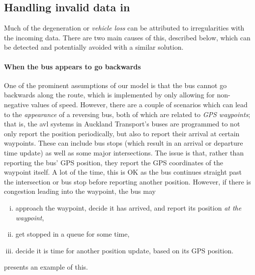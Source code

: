 \subsection{Handling invalid data in \rt{}}
\label{sec:data_issues}

Much of the degeneration or \emph{vehicle loss} can be attributed to irregularities with the incoming \rt{} data. There are two main causes of this, described below, which can be detected and potentially avoided with a similar solution.


\paragraph{When the bus appears to go backwards}

One of the prominent assumptions of our model is that the bus cannot go backwards along the route, which is implemented by only allowing for non-negative values of speed. However, there are a couple of scenarios which can lead to the \emph{appearance} of a reversing bus, both of which are related to \emph{GPS waypoints}; that is, the \gls{avl} systems in Auckland Transport's buses are programmed to not only report the position periodically, but also to report their arrival at certain waypoints. These can include bus stops (which result in an arrival or departure time update) as well as some major intersections. The issue is that, rather than reporting the bus' GPS position, they report the GPS coordinates of the waypoint itself. A lot of the time, this is OK as the bus continues straight past the intersection or bus stop before reporting another position. However, if there is congestion leading into the waypoint, the bus may
\begin{enumerate}[i.]
\item approach the waypoint, decide it has arrived, and report its position \emph{at the waypoint},
\item get stopped in a queue for some time,
\item decide it is time for another position update, based on its GPS position.
\end{enumerate}
 presents an example of this.

